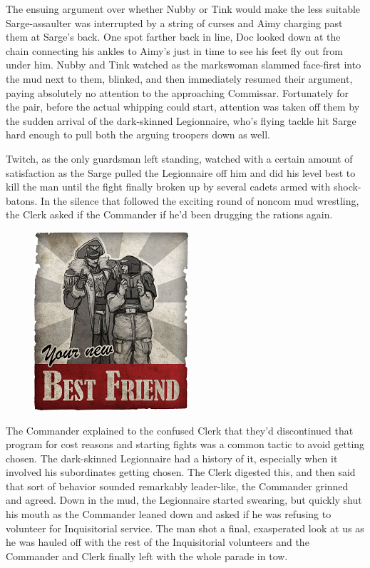The ensuing argument over whether Nubby or Tink would make the less suitable Sarge-assaulter was interrupted by a string of curses and Aimy charging past them at Sarge's back. 
One spot farther back in line, Doc looked down at the chain connecting his ankles to Aimy's just in time to see his feet fly out from under him. 
Nubby and Tink watched as the markswoman slammed face-first into the mud next to them, blinked, and then immediately resumed their argument, paying absolutely no attention to the approaching Commissar. 
Fortunately for the pair, before the actual whipping could start, attention was taken off them by the sudden arrival of the dark-skinned Legionnaire, who's flying tackle hit Sarge hard enough to pull both the arguing troopers down as well. 
 

Twitch, as the only guardsman left standing, watched with a certain amount of satisfaction as the Sarge pulled the Legionnaire off him and did his level best to kill the man until the fight finally broken up by several cadets armed with shock-batons. 
In the silence that followed the exciting round of noncom mud wrestling, the Clerk asked if the Commander if he'd been drugging the rations again.

\begin{figure}
	\begin{center}
		\includegraphics[width=\figwidth]{pics/21/10.png}
	\end{center}
\end{figure}
The Commander explained to the confused Clerk that they'd discontinued that program for cost reasons and starting fights was a common tactic to avoid getting chosen. 
The dark-skinned Legionnaire had a history of it, especially when it involved his subordinates getting chosen. 
The Clerk digested this, and then said that sort of behavior sounded remarkably leader-like, the Commander grinned and agreed. 
Down in the mud, the Legionnaire started swearing, but quickly shut his mouth as the Commander leaned down and asked if he was refusing to volunteer for Inquisitorial service. 
The man shot a final, exasperated look at us as he was hauled off with the rest of the Inquisitorial volunteers and the Commander and Clerk finally left with the whole parade in tow.

